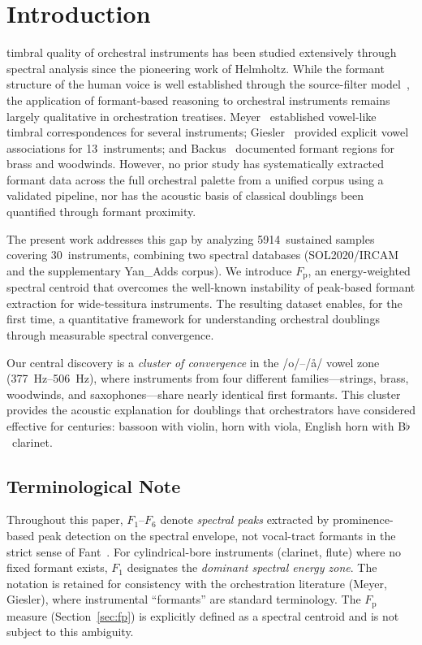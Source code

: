 \documentclass[journal]{IEEEtran}
\newcommand{\Fp}{F_\mathrm{p}}
\newcommand{\Fn}[1]{F_{#1}}
\begin{document}
\section{Introduction}
\label{sec:intro}

 timbral quality of orchestral instruments has been studied extensively through spectral analysis since the pioneering work of Helmholtz. While the formant structure of the human voice is well established through the source-filter model~\cite{fant1960}, the application of formant-based reasoning to orchestral instruments remains largely qualitative in orchestration treatises. Meyer~\cite{meyer2009} established vowel-like timbral correspondences for several instruments; Giesler~\cite{giesler1985} provided explicit vowel associations for 13~instruments; and Backus~\cite{backus1969} documented formant regions for brass and woodwinds. However, no prior study has systematically extracted formant data across the full orchestral palette from a unified corpus using a validated pipeline, nor has the acoustic basis of classical doublings been quantified through formant proximity.

The present work addresses this gap by analyzing \num{5914}~sustained samples covering 30~instruments, combining two spectral databases (SOL2020/IRCAM and the supplementary Yan\_Adds corpus). We introduce $\Fp$, an energy-weighted spectral centroid that overcomes the well-known instability of peak-based formant extraction for wide-tessitura instruments. The resulting dataset enables, for the first time, a quantitative framework for understanding orchestral doublings through measurable spectral convergence.

Our central discovery is a \emph{cluster of convergence} in the /o/--/\aa/ vowel zone (\SIrange{377}{506}{\hertz}), where instruments from four different families---strings, brass, woodwinds, and saxophones---share nearly identical first formants. This cluster provides the acoustic explanation for doublings that orchestrators have considered effective for centuries: bassoon with violin, horn with viola, English horn with B$\flat$~clarinet.

\subsection{Terminological Note}

Throughout this paper, $\Fn{1}$--$\Fn{6}$ denote \emph{spectral peaks} extracted by prominence-based peak detection on the spectral envelope, not vocal-tract formants in the strict sense of Fant~\cite{fant1960}. For cylindrical-bore instruments (clarinet, flute) where no fixed formant exists, $\Fn{1}$ designates the \emph{dominant spectral energy zone}. The notation is retained for consistency with the orchestration literature (Meyer, Giesler), where instrumental ``formants'' are standard terminology. The $\Fp$ measure (Section~\ref{sec:fp}) is explicitly defined as a spectral centroid and is not subject to this ambiguity.
\end{document}
